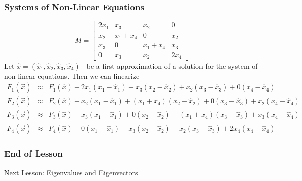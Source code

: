 \documentclass[xcolor=dvipsnames]{beamer}
\begin{document}
\begin{frame}
  \frametitle{Systems of Non-Linear Equations}
  \begin{equation}
    \label{eq:ahghajee}
    M=\left[
      \begin{array}{cccc}
2x_{1} & x_{3}       & x_{2}       & 0     \\
x_{2}  & x_{1}+x_{4} & 0           & x_{2} \\
x_{3}  & 0           & x_{1}+x_{4} & x_{3} \\
0      & x_{3}       & x_{2}       & 2x_{4}
      \end{array}\right]
  \end{equation}
Let
$\hat{x}=(\hat{x}_{1},\hat{x}_{2},\hat{x}_{3},\hat{x}_{4})^{\intercal}$
be a first approximation of a solution for the system of non-linear
equations. Then we can linearize
\begin{equation}
  \label{eq:ahthaith}
  \begin{array}{ccc}
F_{1}(\vec{x}) & \approx & F_{1}(\hat{x})+2x_{1}(x_{1}-\hat{x}_{1})+x_{3}(x_{2}-\hat{x}_{2})+x_{2}(x_{3}-\hat{x}_{3})+0(x_{4}-\hat{x}_{4})         \\
F_{2}(\vec{x}) & \approx & F_{2}(\hat{x})+x_{2}(x_{1}-\hat{x}_{1})+(x_{1}+x_{4})(x_{2}-\hat{x}_{2})+0(x_{3}-\hat{x}_{3})+x_{2}(x_{4}-\hat{x}_{4})  \\
F_{3}(\vec{x}) & \approx & F_{3}(\hat{x})+x_{3}(x_{1}-\hat{x}_{1})+0(x_{2}-\hat{x}_{2})+(x_{1}+x_{4})(x_{3}-\hat{x}_{3})+x_{3}(x_{4}-\hat{x}_{4})  \\
F_{4}(\vec{x}) & \approx & F_{4}(\hat{x})+0(x_{1}-\hat{x}_{1})+x_{3}(x_{2}-\hat{x}_{2})+x_{2}(x_{3}-\hat{x}_{3})+2x_{4}(x_{4}-\hat{x}_{4})        
  \end{array}
\end{equation}
\end{frame}

\begin{frame}
  \frametitle{End of Lesson}
Next Lesson: Eigenvalues and Eigenvectors
\end{frame}
\end{document}
